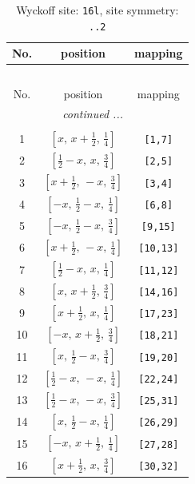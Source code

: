 \documentclass[fleqn,8pt]{jsarticle}
\begin{document}
\renewcommand{\arraystretch}{1.2}
\begin{longtable}{ccc}
\caption{Wyckoff site: {\tt 16l}, site symmetry: {\tt ..2}}
 \\
 \hline \hline
No. & position & mapping \\ \hline \endfirsthead

\multicolumn{2}{l}{\tablename\ \thetable{}} \\
 \hline \hline
No. & position & mapping \\ \hline \endhead

 \hline \hline
\multicolumn{2}{r}{\footnotesize\it continued ...} \\ \endfoot

 \hline \hline
\multicolumn{2}{r}{} \\ \endlastfoot

1 & $\left[ x,\, x + \frac{1}{2},\, \frac{1}{4} \right]$ & {\tt [1,7]} \\ \hline
2 & $\left[ \frac{1}{2} - x,\, x,\, \frac{3}{4} \right]$ & {\tt [2,5]} \\ \hline
3 & $\left[ x + \frac{1}{2},\, - x,\, \frac{3}{4} \right]$ & {\tt [3,4]} \\ \hline
4 & $\left[ - x,\, \frac{1}{2} - x,\, \frac{1}{4} \right]$ & {\tt [6,8]} \\ \hline
5 & $\left[ - x,\, \frac{1}{2} - x,\, \frac{3}{4} \right]$ & {\tt [9,15]} \\ \hline
6 & $\left[ x + \frac{1}{2},\, - x,\, \frac{1}{4} \right]$ & {\tt [10,13]} \\ \hline
7 & $\left[ \frac{1}{2} - x,\, x,\, \frac{1}{4} \right]$ & {\tt [11,12]} \\ \hline
8 & $\left[ x,\, x + \frac{1}{2},\, \frac{3}{4} \right]$ & {\tt [14,16]} \\ \hline
9 & $\left[ x + \frac{1}{2},\, x,\, \frac{1}{4} \right]$ & {\tt [17,23]} \\ \hline
10 & $\left[ - x,\, x + \frac{1}{2},\, \frac{3}{4} \right]$ & {\tt [18,21]} \\ \hline
11 & $\left[ x,\, \frac{1}{2} - x,\, \frac{3}{4} \right]$ & {\tt [19,20]} \\ \hline
12 & $\left[ \frac{1}{2} - x,\, - x,\, \frac{1}{4} \right]$ & {\tt [22,24]} \\ \hline
13 & $\left[ \frac{1}{2} - x,\, - x,\, \frac{3}{4} \right]$ & {\tt [25,31]} \\ \hline
14 & $\left[ x,\, \frac{1}{2} - x,\, \frac{1}{4} \right]$ & {\tt [26,29]} \\ \hline
15 & $\left[ - x,\, x + \frac{1}{2},\, \frac{1}{4} \right]$ & {\tt [27,28]} \\ \hline
16 & $\left[ x + \frac{1}{2},\, x,\, \frac{3}{4} \right]$ & {\tt [30,32]} \\
\end{longtable}
\end{document}
